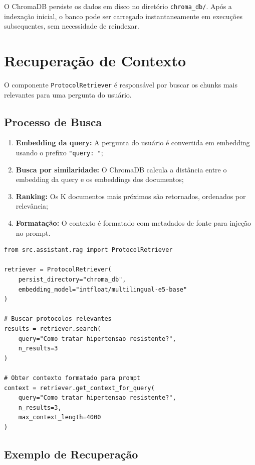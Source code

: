 \begin{infobox}
O ChromaDB persiste os dados em disco no diretório \texttt{chroma\_db/}. Após a indexação inicial, o banco pode ser carregado instantaneamente em execuções subsequentes, sem necessidade de reindexar.
\end{infobox}

\section{Recuperação de Contexto}

O componente \texttt{ProtocolRetriever} é responsável por buscar os chunks mais relevantes para uma pergunta do usuário.

\subsection{Processo de Busca}

\begin{enumerate}
    \item \textbf{Embedding da query:} A pergunta do usuário é convertida em embedding usando o prefixo \texttt{"query: "};
    \item \textbf{Busca por similaridade:} O ChromaDB calcula a distância entre o embedding da query e os embeddings dos documentos;
    \item \textbf{Ranking:} Os K documentos mais próximos são retornados, ordenados por relevância;
    \item \textbf{Formatação:} O contexto é formatado com metadados de fonte para injeção no prompt.
\end{enumerate}

\begin{lstlisting}[caption={Exemplo de uso do ProtocolRetriever.}]
from src.assistant.rag import ProtocolRetriever

retriever = ProtocolRetriever(
    persist_directory="chroma_db",
    embedding_model="intfloat/multilingual-e5-base"
)

# Buscar protocolos relevantes
results = retriever.search(
    query="Como tratar hipertensao resistente?",
    n_results=3
)

# Obter contexto formatado para prompt
context = retriever.get_context_for_query(
    query="Como tratar hipertensao resistente?",
    n_results=3,
    max_context_length=4000
)
\end{lstlisting}

\subsection{Exemplo de Recuperação}


